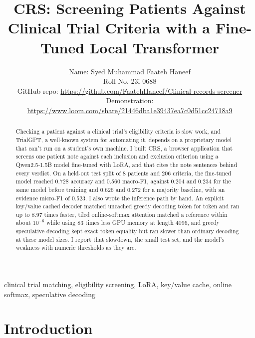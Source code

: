 \documentclass[conference]{IEEEtran}
\begin{document}
\title{CRS: Screening Patients Against Clinical Trial Criteria with a Fine-Tuned Local Transformer}

\author{\begin{minipage}{\textwidth}\raggedright\normalsize
Name: Syed Muhammad Faateh Haneef\\
Roll No. 23i-0688\\
GitHub repo: \url{https://github.com/FaatehHaneef/Clinical-records-screener}\\
Demonstration: \url{https://www.loom.com/share/21446dba1e39437ea7c0d51cc24718a9}
\end{minipage}}

\IEEEaftertitletext{\vspace{-9pt}}
\maketitle

\begin{abstract}
Checking a patient against a clinical trial's eligibility criteria is slow work, and TrialGPT, a well-known system for automating it, depends on a proprietary model that can't run on a student's own machine. I built CRS, a browser application that screens one patient note against each inclusion and exclusion criterion using a Qwen2.5-1.5B model fine-tuned with LoRA, and that cites the note sentences behind every verdict. On a held-out test split of 8 patients and 206 criteria, the fine-tuned model reached 0.728 accuracy and 0.560 macro-F1, against 0.204 and 0.234 for the same model before training and 0.626 and 0.272 for a majority baseline, with an evidence micro-F1 of 0.523. I also wrote the inference path by hand. An explicit key/value cached decoder matched uncached greedy decoding token for token and ran up to 8.97 times faster, tiled online-softmax attention matched a reference within about $10^{-6}$ while using 83 times less GPU memory at length 4096, and greedy speculative decoding kept exact token equality but ran slower than ordinary decoding at these model sizes. I report that slowdown, the small test set, and the model's weakness with numeric thresholds as they are.
\end{abstract}

\begin{IEEEkeywords}
clinical trial matching, eligibility screening, LoRA, key/value cache, online softmax, speculative decoding
\end{IEEEkeywords}

\section{Introduction}
\end{document}
